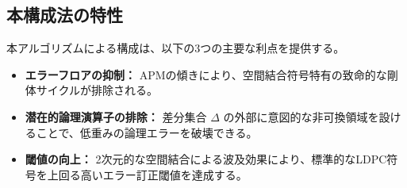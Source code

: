 \documentclass[12pt]{article}
\begin{document}
\subsection{本構成法の特性}

本アルゴリズムによる構成は、以下の3つの主要な利点を提供する。

\begin{itemize}
    \item \textbf{エラーフロアの抑制：} APMの傾きにより、空間結合符号特有の致命的な剛体サイクルが排除される。
    \item \textbf{潜在的論理演算子の排除：} 差分集合 $\Delta$ の外部に意図的な非可換領域を設けることで、低重みの論理エラーを破壊できる。
    \item \textbf{閾値の向上：} 2次元的な空間結合による波及効果により、標準的なLDPC符号を上回る高いエラー訂正閾値を達成する。
\end{itemize}
\end{document}
